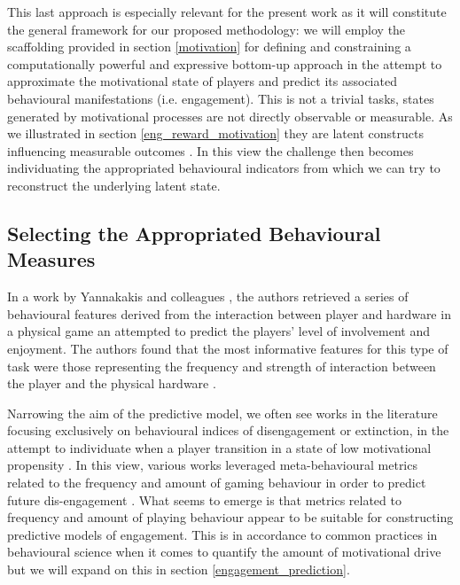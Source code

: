 This last approach is especially relevant for the present work as it will constitute the general framework for our proposed methodology: we will employ the scaffolding provided in section \ref{motivation} for defining and constraining a computationally powerful and expressive bottom-up approach in the attempt to approximate the motivational state of players and predict its associated behavioural manifestations (i.e. engagement). This is not a trivial tasks, states generated by motivational processes are not directly observable or measurable. As we illustrated in section \ref{eng_reward_motivation} they are latent constructs influencing measurable outcomes \cite{yannakakis2007game, bauckhage2012players}. In this view the challenge then becomes individuating the appropriated behavioural indicators from which we can try to reconstruct the underlying latent state. 

\subsection{Selecting the Appropriated Behavioural Measures} In a work by Yannakakis and colleagues \cite{yannakakis2007game}, the authors retrieved a series of behavioural features derived from the interaction between player and hardware in a physical game an attempted to predict the players' level of involvement and enjoyment. The authors found that the most informative features for this type of task were those representing the frequency and strength of interaction between the player and the physical hardware \cite{yannakakis2007game}. 

Narrowing the aim of the predictive model, we often see works in the literature focusing exclusively on behavioural indices of disengagement or extinction, in the attempt to individuate when a player transition in a state of low motivational propensity \cite{el2021game}. In this view, various works leveraged meta-behavioural metrics related to the frequency and amount of gaming behaviour in order to predict future dis-engagement \cite{runge2014churn, kim2017churn, hadiji2014predicting}. What seems to emerge is that metrics related to frequency and amount of playing behaviour appear to be suitable for constructing predictive models of engagement. This is in accordance to common practices in behavioural science when it comes to quantify the amount of motivational drive \cite{cacioppo2007handbook} but we will expand on this in section \ref{engagement_prediction}. 

